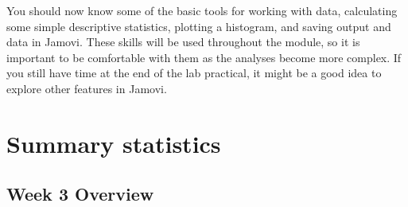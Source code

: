 \documentclass[
]{scrbook}
\begin{document}
You should now know some of the basic tools for working with data, calculating some simple descriptive statistics, plotting a histogram, and saving output and data in Jamovi.
These skills will be used throughout the module, so it is important to be comfortable with them as the analyses become more complex.
If you still have time at the end of the lab practical, it might be a good idea to explore other features in Jamovi.

\hypertarget{part-summary-statistics}{%
\part{Summary statistics}\label{part-summary-statistics}}

\hypertarget{Week3}{%
\chapter*{Week 3 Overview}\label{Week3}}
\end{document}
